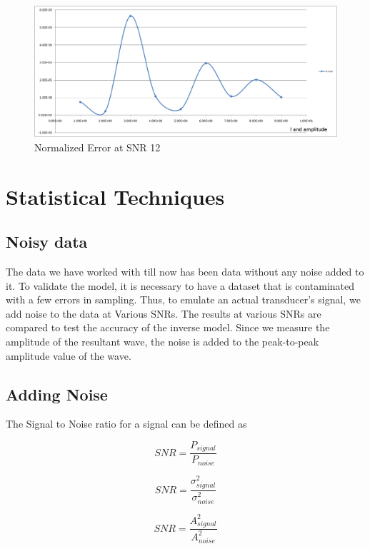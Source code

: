 \begin{figure}
\begin{center}
\includegraphics[scale=0.5]{images/chapter_5/forward/error_snr_12.png}
\caption{Normalized Error at SNR 12}
\end{center}
\end{figure}

\section{Statistical Techniques}
\subsection{Noisy data}
The data we have worked with till now has been data without any noise added to it. To validate the model, it is necessary to have a dataset that is contaminated with a few errors in sampling. Thus, to emulate an actual transducer's signal, we add noise to the data at Various SNRs. The results at various SNRs are compared to test the accuracy of the inverse model. Since we measure the amplitude of the resultant wave, the noise is added to the peak-to-peak amplitude value of the wave. 
\subsection{Adding Noise}
The Signal to Noise ratio for a signal can be defined as 

\begin{equation}
SNR = \frac{P_{signal}}{P_{noise}}
\end{equation}

\begin{equation}
SNR = \frac{\sigma^2_{signal}}{\sigma^2_{noise}}
\end{equation}

\begin{equation}
SNR = \frac{A^2_{signal}}{A^2_{noise}}
\end{equation}

